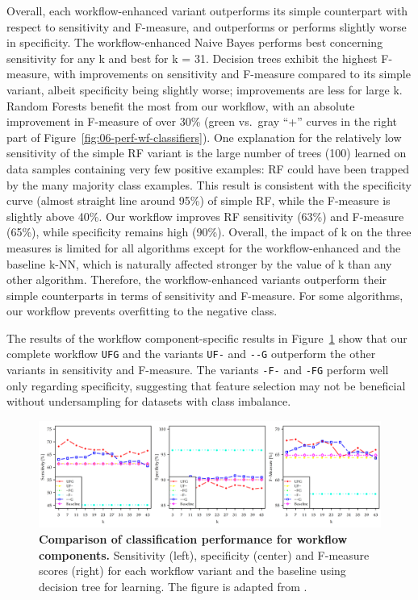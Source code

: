 \documentclass[
  oneside]{book}
\begin{document}
Overall, each workflow-enhanced variant outperforms its simple counterpart with respect to sensitivity and F-measure, and outperforms or performs slightly worse in specificity.
The workflow-enhanced Naive Bayes performs best concerning sensitivity for any k and best for k = 31.
Decision trees exhibit the highest F-measure, with improvements on sensitivity and F-measure compared to its simple variant, albeit specificity being slightly worse; improvements are less for large k.
Random Forests benefit the most from our workflow, with an absolute improvement in F-measure of over 30\% (green vs.~gray ``+'' curves in the right part of Figure~\ref{fig:06-perf-wf-classifiers}).
One explanation for the relatively low sensitivity of the simple RF variant is the large number of trees (100) learned on data samples containing very few positive examples: RF could have been trapped by the many majority class examples.
This result is consistent with the specificity curve (almost straight line around 95\%) of simple RF, while the F-measure is slightly above 40\%.
Our workflow improves RF sensitivity (63\%) and F-measure (65\%), while specificity remains high (90\%).
Overall, the impact of k on the three measures is limited for all algorithms except for the workflow-enhanced and the baseline k-NN, which is naturally affected stronger by the value of k than any other algorithm.
Therefore, the workflow-enhanced variants outperform their simple counterparts in terms of sensitivity and F-measure. For some algorithms, our workflow prevents overfitting to the negative class.

The results of the workflow component-specific results in Figure~\ref{fig:06-perf-wf-components} show that our complete workflow \texttt{UFG} and the variants \texttt{UF-} and \texttt{-\/-G} outperform the other variants in sensitivity and F-measure.
The variants \texttt{-F-} and \texttt{-FG} perform well only regarding specificity, suggesting that feature selection may not be beneficial without undersampling for datasets with class imbalance.



\begin{figure}[htb]

{\centering \includegraphics[width=1\linewidth]{figures/06-perf-wf-components-palatino} 

}

\caption{\textbf{Comparison of classification performance for workflow components.} Sensitivity (left), specificity (center) and F-measure scores (right) for each workflow variant and the baseline using decision tree for learning. The figure is adapted from \autocite{Niemann:CBMS2015}.}\label{fig:06-perf-wf-components}
\end{figure}
\end{document}
